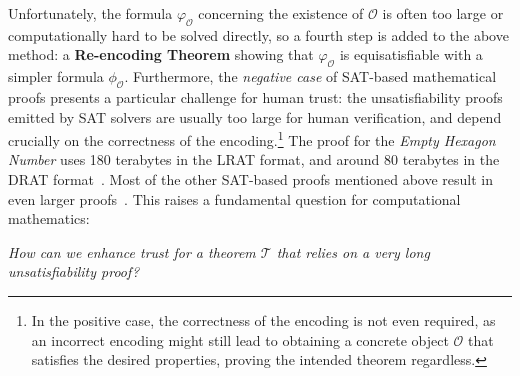 Unfortunately, the formula $\varphi_{\mathcal{O}}$ concerning the existence of $\mathcal{O}$ is often too large or computationally hard to be solved directly, so a fourth step is added to the above method: a \textbf{Re-encoding Theorem} showing that $\varphi_{\mathcal{O}}$ is equisatisfiable with a simpler formula $\phi_{\mathcal{O}}$.
Furthermore,
the \emph{negative case} of SAT-based mathematical proofs presents a particular challenge for human trust: the unsatisfiability proofs emitted by SAT solvers are usually too large for human verification, and depend crucially on the correctness of the encoding.\footnote{In the positive case, the correctness of the encoding is not even required, as an incorrect encoding might still lead to obtaining a concrete object $\mathcal{O}$ that satisfies the desired properties, proving the intended theorem regardless.}
The proof for the \emph{Empty Hexagon Number} uses 180 terabytes in the \textsf{LRAT} format, and around 80 terabytes in the \textsf{DRAT} format~\cite{emptyHexagonNumber}. Most of the other SAT-based proofs mentioned above result in even larger proofs~\cite{Heule_2016,lambTwohundredterabyteMathsProof2016,heule2017schur,Subercaseaux_Heule_2023}.
This raises a fundamental question for computational mathematics:
\begin{center}
  \emph{How can we enhance trust for a theorem $\mathcal{T}$ that relies on a very long unsatisfiability proof?}
\end{center}
